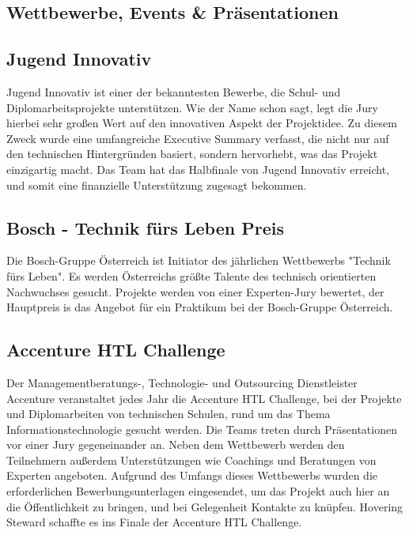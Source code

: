   \subsection{Wettbewerbe, Events & Präsentationen}

    \subsection*{Jugend Innovativ}
    {Jugend Innovativ\cite{jugendinnovativ}} ist einer der bekanntesten Bewerbe, die Schul- und Diplomarbeitsprojekte
    unterstützen. Wie der Name schon sagt, legt die Jury hierbei sehr großen Wert auf den innovativen
    Aspekt der Projektidee. Zu diesem Zweck wurde eine umfangreiche Executive Summary verfasst, die nicht
    nur auf den technischen Hintergründen basiert, sondern hervorhebt, was das Projekt einzigartig
    macht. Das Team hat das Halbfinale von Jugend Innovativ erreicht, und somit eine finanzielle Unterstützung
    zugesagt bekommen.

    \subsection*{Bosch - Technik fürs Leben Preis}
    Die Bosch-Gruppe Österreich ist Initiator des jährlichen Wettbewerbs {"Technik fürs Leben"\cite{bosch}}. Es werden Österreichs
    größte Talente des technisch orientierten Nachwuchses gesucht. Projekte werden von einer Experten-Jury bewertet,
    der Hauptpreis is das Angebot für ein Praktikum bei der Bosch-Gruppe Österreich.

    \subsection*{Accenture HTL Challenge}
    Der Managementberatungs-, Technologie- und Outsourcing Dienstleister {Accenture\cite{accenture}} veranstaltet jedes Jahr die Accenture HTL Challenge,
    bei der Projekte und Diplomarbeiten von technischen Schulen, rund um das Thema Informationstechnologie gesucht werden.
    Die Teams treten durch Präsentationen vor einer Jury gegeneinander an. Neben dem Wettbewerb werden den Teilnehmern außerdem
    Unterstützungen wie Coachings und Beratungen von Experten angeboten. Aufgrund des Umfangs dieses Wettbewerbs wurden die erforderlichen Bewerbungsunterlagen eingesendet,
    um das Projekt auch hier an die Öffentlichkeit zu bringen, und bei Gelegenheit Kontakte zu knüpfen. Hovering Steward schaffte es ins Finale der
    Accenture HTL Challenge.

